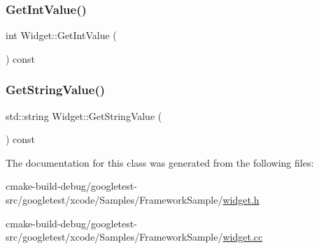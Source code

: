 \subsubsection{\texorpdfstring{GetIntValue()}{GetIntValue()}}
{\footnotesize\ttfamily int Widget\+::\+Get\+Int\+Value (\begin{DoxyParamCaption}{ }\end{DoxyParamCaption}) const}

\mbox{\label{classWidget_a7a6e3a7fca3a9373f631c94dc1494d22}} 
\subsubsection{\texorpdfstring{GetStringValue()}{GetStringValue()}}
{\footnotesize\ttfamily std\+::string Widget\+::\+Get\+String\+Value (\begin{DoxyParamCaption}{ }\end{DoxyParamCaption}) const}



The documentation for this class was generated from the following files\+:\begin{DoxyCompactItemize}
\item 
cmake-\/build-\/debug/googletest-\/src/googletest/xcode/\+Samples/\+Framework\+Sample/\mbox{\hyperlink{widget_8h}{widget.\+h}}\item 
cmake-\/build-\/debug/googletest-\/src/googletest/xcode/\+Samples/\+Framework\+Sample/\mbox{\hyperlink{widget_8cc}{widget.\+cc}}\end{DoxyCompactItemize}
